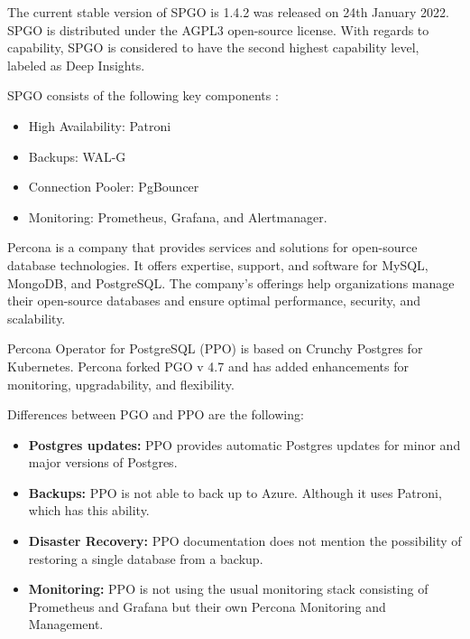 The current stable version of SPGO is 1.4.2 was released on 24th January 2022. \cite{SPGOgitlabChangelog} SPGO is distributed under the AGPL3 open-source license. \cite{SPGODocuLicence}
With regards to capability, SPGO is considered to have the second highest capability level, labeled as Deep Insights. \cite{OperatorHubStackgres}

SPGO consists of the following key components \cite{PostgresOnKubernetes}:
\begin{itemize}
  \item High Availability: Patroni
  \item Backups: WAL-G
  \item Connection Pooler: PgBouncer
  \item Monitoring: Prometheus, Grafana, and Alertmanager.
\end{itemize}



\pagebreak
{}
Percona is a company that provides services and solutions for open-source database technologies. It offers expertise, support, and software for MySQL, MongoDB, and PostgreSQL. The company's offerings help organizations manage their open-source databases and ensure optimal performance, security, and scalability. \cite{Percona}

Percona Operator for PostgreSQL (PPO) is based on Crunchy Postgres for Kubernetes. Percona forked PGO v 4.7 and has added enhancements for monitoring, upgradability, and flexibility. \cite{PerconaBlogProsAndCons}

Differences between PGO and PPO are the following:
\begin{itemize}
  \item \textbf{Postgres updates:} PPO provides automatic Postgres updates for minor and major versions of Postgres.  \cite{PerconaDocuUpdate}
  \item \textbf{Backups:} PPO is not able to back up to Azure. \cite{PerconaDocuCompare} Although it uses Patroni, which has this ability.
  \item \textbf{Disaster Recovery:} PPO documentation does not mention the possibility of restoring a single database from a backup. \cite{PerconaDocuBackups}
  \item \textbf{Monitoring:} PPO is not using the usual monitoring stack consisting of Prometheus and Grafana but their own Percona Monitoring and Management. \cite{PerconaDocuMonitoring}
\end{itemize}

